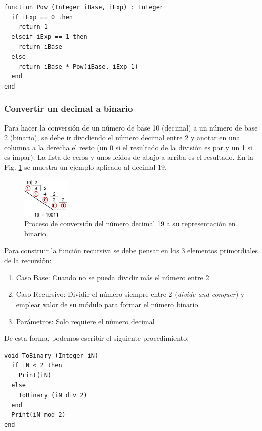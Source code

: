 \begin{lstlisting}[upquote=true, language=pseudo]
function Pow (Integer iBase, iExp) : Integer
  if iExp == 0 then
    return 1
  elseif iExp == 1 then
    return iBase
  else
    return iBase * Pow(iBase, iExp-1)
  end
end
\end{lstlisting}

\subsubsection{Convertir un decimal a binario}

Para hacer la conversión de un número de base 10 (decimal) a un número de base 2 (binario), se debe ir dividiendo el número decimal entre 2 y anotar en una columna a la derecha el resto (un 0 si el resultado de la división es par y un 1 si es impar). La lista de ceros y unos leídos de abajo a arriba es el resultado. En la Fig. \ref{fig:Ch1decbin} se muestra un ejemplo aplicado al decimal 19.

\begin{figure}[htpb!]
  \begin{center}
    \includegraphics[width=0.2\textwidth]{images/decbin.png}
  \end{center}
  \caption{Proceso de conversión del número decimal 19 a su representación en binario.}
  \label{fig:Ch1decbin}
\end{figure}

Para construir la función recursiva se debe pensar en los 3 elementos primordiales de la recursión:
\begin{enumerate}
\item Caso Base: Cuando no se pueda dividir más el número entre 2
\item Caso Recursivo: Dividir el número siempre entre 2 (\textit{divide and conquer}) y emplear valor de su módulo para formar el número binario
\item Parámetros: Solo requiere el número decimal
\end{enumerate}

De esta forma, podemos escribir el siguiente procedimiento:

\begin{lstlisting}[upquote=true, language=pseudo]
void ToBinary (Integer iN)
  if iN < 2 then
    Print(iN)
  else
    ToBinary (iN div 2)
  end
  Print(iN mod 2)
end
\end{lstlisting}

